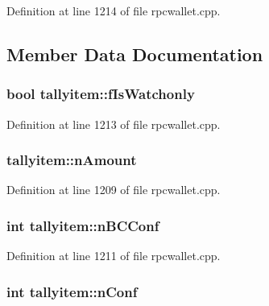Definition at line 1214 of file rpcwallet.\+cpp.



\subsection{Member Data Documentation}
\hypertarget{structtallyitem_a9e7a70ef944206ebb0f3a394eba92673}{}
\subsubsection[{f\+Is\+Watchonly}]{\setlength{\rightskip}{0pt plus 5cm}bool tallyitem\+::f\+Is\+Watchonly}\label{structtallyitem_a9e7a70ef944206ebb0f3a394eba92673}


Definition at line 1213 of file rpcwallet.\+cpp.

\hypertarget{structtallyitem_acc553807f036face8ef10eac9f277d79}{}
\subsubsection[{n\+Amount}]{ tallyitem\+::n\+Amount}\label{structtallyitem_acc553807f036face8ef10eac9f277d79}


Definition at line 1209 of file rpcwallet.\+cpp.

\hypertarget{structtallyitem_a26a2ae690f2b19636b2d87992ae7e123}{}
\subsubsection[{n\+B\+C\+Conf}]{\setlength{\rightskip}{0pt plus 5cm}int tallyitem\+::n\+B\+C\+Conf}\label{structtallyitem_a26a2ae690f2b19636b2d87992ae7e123}


Definition at line 1211 of file rpcwallet.\+cpp.

\hypertarget{structtallyitem_a3b2facf2b1290561c5eabb22bc26c22d}{}
\subsubsection[{n\+Conf}]{\setlength{\rightskip}{0pt plus 5cm}int tallyitem\+::n\+Conf}\label{structtallyitem_a3b2facf2b1290561c5eabb22bc26c22d}


